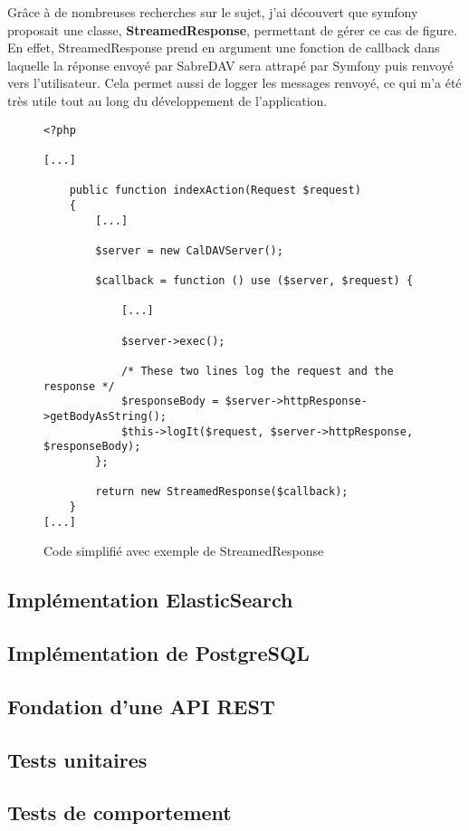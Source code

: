 Grâce à de nombreuses recherches sur le sujet, j'ai découvert que symfony proposait une classe, \textbf{StreamedResponse}, permettant de gérer ce cas de figure. En effet, StreamedResponse prend en argument une fonction de callback dans laquelle la réponse envoyé par SabreDAV sera attrapé par Symfony puis renvoyé vers l'utilisateur. Cela permet aussi de logger les messages renvoyé, ce qui m'a été très utile tout au long du développement de l'application.

\newpage

\begin{figure}[h]
\begin{lstlisting}[frame=single]
<?php

[...]

    public function indexAction(Request $request)
    {
        [...]

        $server = new CalDAVServer();

        $callback = function () use ($server, $request) {

            [...]

            $server->exec();

            /* These two lines log the request and the response */
            $responseBody = $server->httpResponse->getBodyAsString();
            $this->logIt($request, $server->httpResponse, $responseBody);
        };

        return new StreamedResponse($callback);
    }
[...]

\end{lstlisting}
\caption{Code simplifié avec exemple de StreamedResponse}
\end{figure}


\subsection{Implémentation ElasticSearch}

\subsection{Implémentation de PostgreSQL}

\subsection{Fondation d'une API REST}


\subsection{Tests unitaires}

\subsection{Tests de comportement}